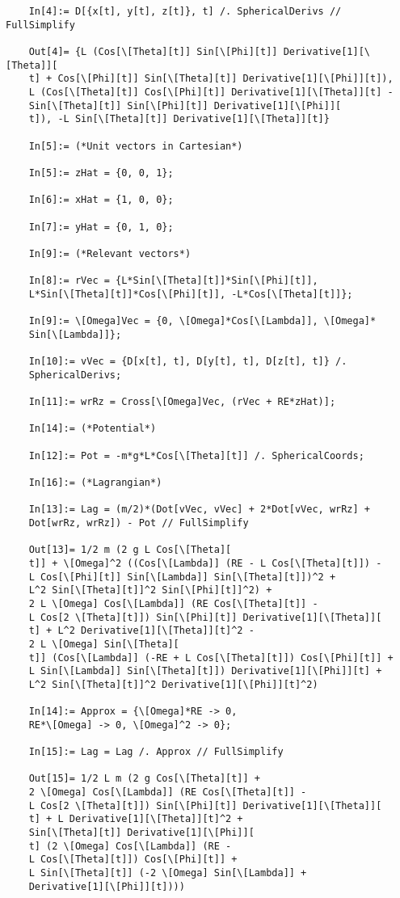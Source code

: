 \documentclass{article}
\theoremstyle{definition}
\begin{document}
\begin{enumerate}[label=(\alph*)]
\begin{lstlisting}
	In[4]:= D[{x[t], y[t], z[t]}, t] /. SphericalDerivs // FullSimplify
	
	Out[4]= {L (Cos[\[Theta][t]] Sin[\[Phi][t]] Derivative[1][\[Theta]][
	t] + Cos[\[Phi][t]] Sin[\[Theta][t]] Derivative[1][\[Phi]][t]), 
	L (Cos[\[Theta][t]] Cos[\[Phi][t]] Derivative[1][\[Theta]][t] - 
	Sin[\[Theta][t]] Sin[\[Phi][t]] Derivative[1][\[Phi]][
	t]), -L Sin[\[Theta][t]] Derivative[1][\[Theta]][t]}
	
	In[5]:= (*Unit vectors in Cartesian*)
	
	In[5]:= zHat = {0, 0, 1};
	
	In[6]:= xHat = {1, 0, 0};
	
	In[7]:= yHat = {0, 1, 0};
	
	In[9]:= (*Relevant vectors*)
	
	In[8]:= rVec = {L*Sin[\[Theta][t]]*Sin[\[Phi][t]], 
	L*Sin[\[Theta][t]]*Cos[\[Phi][t]], -L*Cos[\[Theta][t]]};
	
	In[9]:= \[Omega]Vec = {0, \[Omega]*Cos[\[Lambda]], \[Omega]*
	Sin[\[Lambda]]};
	
	In[10]:= vVec = {D[x[t], t], D[y[t], t], D[z[t], t]} /. 
	SphericalDerivs;
	
	In[11]:= wrRz = Cross[\[Omega]Vec, (rVec + RE*zHat)];
	
	In[14]:= (*Potential*)
	
	In[12]:= Pot = -m*g*L*Cos[\[Theta][t]] /. SphericalCoords;
	
	In[16]:= (*Lagrangian*)
	
	In[13]:= Lag = (m/2)*(Dot[vVec, vVec] + 2*Dot[vVec, wrRz] + 
	Dot[wrRz, wrRz]) - Pot // FullSimplify
	
	Out[13]= 1/2 m (2 g L Cos[\[Theta][
	t]] + \[Omega]^2 ((Cos[\[Lambda]] (RE - L Cos[\[Theta][t]]) - 
	L Cos[\[Phi][t]] Sin[\[Lambda]] Sin[\[Theta][t]])^2 + 
	L^2 Sin[\[Theta][t]]^2 Sin[\[Phi][t]]^2) + 
	2 L \[Omega] Cos[\[Lambda]] (RE Cos[\[Theta][t]] - 
	L Cos[2 \[Theta][t]]) Sin[\[Phi][t]] Derivative[1][\[Theta]][
	t] + L^2 Derivative[1][\[Theta]][t]^2 - 
	2 L \[Omega] Sin[\[Theta][
	t]] (Cos[\[Lambda]] (-RE + L Cos[\[Theta][t]]) Cos[\[Phi][t]] + 
	L Sin[\[Lambda]] Sin[\[Theta][t]]) Derivative[1][\[Phi]][t] + 
	L^2 Sin[\[Theta][t]]^2 Derivative[1][\[Phi]][t]^2)
	
	In[14]:= Approx = {\[Omega]*RE -> 0, 
	RE*\[Omega] -> 0, \[Omega]^2 -> 0};
	
	In[15]:= Lag = Lag /. Approx // FullSimplify
	
	Out[15]= 1/2 L m (2 g Cos[\[Theta][t]] + 
	2 \[Omega] Cos[\[Lambda]] (RE Cos[\[Theta][t]] - 
	L Cos[2 \[Theta][t]]) Sin[\[Phi][t]] Derivative[1][\[Theta]][
	t] + L Derivative[1][\[Theta]][t]^2 + 
	Sin[\[Theta][t]] Derivative[1][\[Phi]][
	t] (2 \[Omega] Cos[\[Lambda]] (RE - 
	L Cos[\[Theta][t]]) Cos[\[Phi][t]] + 
	L Sin[\[Theta][t]] (-2 \[Omega] Sin[\[Lambda]] + 
	Derivative[1][\[Phi]][t])))
	

\end{lstlisting}
\end{enumerate}
\end{document}
